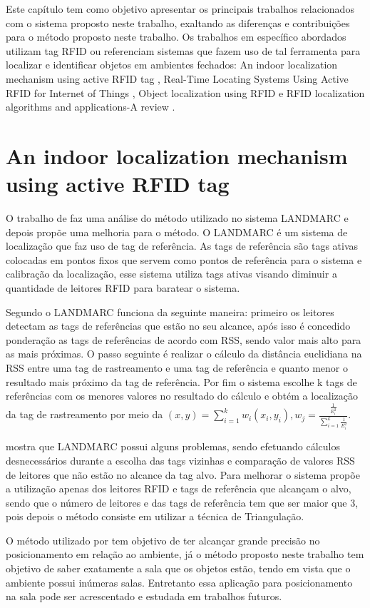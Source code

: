 \label{chapter:correlatos}
Este capítulo tem como objetivo apresentar os principais trabalhos relacionados com o sistema proposto neste trabalho, exaltando as diferenças e contribuições para o método proposto neste trabalho. Os trabalhos em específico abordados utilizam tag RFID ou referenciam sistemas que fazem uso de tal ferramenta para localizar e identificar objetos em ambientes fechados: An indoor localization mechanism using active RFID tag \cite{mechanismRFID2006}, Real-Time Locating Systems Using Active RFID for Internet of Things \cite{realtimeRFID2016}, Object localization using RFID \cite{localization2010} e RFID localization algorithms and applications-A review \cite{rfid2009review}.

\section{An indoor localization mechanism using active RFID tag}
O trabalho de \citeauthor{mechanismRFID2006} faz uma análise do método utilizado no sistema LANDMARC e depois propõe uma melhoria para o método. O LANDMARC é um sistema de localização que faz uso de tag de referência. As tags de referência são tags ativas colocadas em pontos fixos que servem como pontos de referência para o sistema e calibração da localização, esse sistema utiliza tags ativas visando diminuir a quantidade de leitores RFID para baratear o sistema.

\par
Segundo \citeauthor{mechanismRFID2006} o LANDMARC funciona da seguinte maneira: primeiro os leitores detectam as tags de referências que estão no seu alcance, após isso é concedido ponderação as tags de referências de acordo com RSS, sendo valor mais alto para as mais próximas. O passo seguinte é realizar o cálculo da distância euclidiana na RSS entre uma tag de rastreamento e uma tag de referência e quanto menor o resultado mais próximo da tag de referência. Por fim o sistema escolhe k tags de referências com os menores valores no resultado do cálculo e obtém a localização da tag de rastreamento por meio da $(x,y) = \sum^k_{i=1}w_i(x_i,y_i), w_j=\frac{\frac{1}{E_i^2}}{\sum_{i=1}^k\frac{1}{E^2_i}}$. 
\par
\citeauthor{mechanismRFID2006} mostra que LANDMARC possui alguns problemas, sendo efetuando cálculos desnecessários durante a escolha das tags vizinhas e comparação de valores RSS de leitores que não estão no alcance da tag alvo. Para melhorar o sistema \citeauthor{mechanismRFID2006} propõe a utilização apenas dos leitores RFID  e tags de referência que alcançam o alvo, sendo que o número de leitores e das tags de referência tem que ser maior que 3, pois depois o método consiste em utilizar a técnica de Triangulação.
\par
O método utilizado por \citeauthor{mechanismRFID2006} tem objetivo de ter alcançar grande precisão no posicionamento em relação ao ambiente, já o método proposto neste trabalho tem objetivo de saber exatamente a sala que os objetos estão, tendo em vista que o ambiente possui inúmeras salas. Entretanto essa aplicação para posicionamento na sala pode ser acrescentado e estudada em trabalhos futuros.

